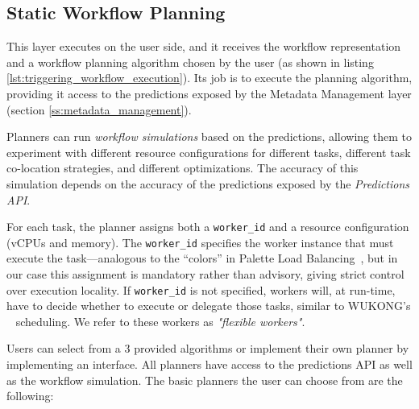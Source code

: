 \documentclass[conference]{IEEEtran}
\begin{document}
\subsection{Static Workflow Planning}
This layer executes on the user side, and it receives the workflow representation and a workflow planning algorithm chosen by the user (as shown in listing \ref{lst:triggering_workflow_execution}). Its job is to execute the planning algorithm, providing it access to the predictions exposed by the Metadata Management layer (section \ref{ss:metadata_management}).

Planners can run \textit{workflow simulations} based on the predictions, allowing them to experiment with different resource configurations for different tasks, different task co-location strategies, and different optimizations. The accuracy of this simulation depends on the accuracy of the predictions exposed by the \textit{Predictions API}.

For each task, the planner assigns both a \texttt{worker\_id} and a resource configuration (vCPUs and memory). The \texttt{worker\_id} specifies the worker instance that must execute the task—analogous to the “colors” in Palette Load Balancing~\cite{palette_load_balancing}, but in our case this assignment is mandatory rather than advisory, giving strict control over execution locality. If \texttt{worker\_id} is not specified, workers will, at run-time, have to decide whether to execute or delegate those tasks, similar to WUKONG's ~\cite{wukong_2} scheduling. We refer to these workers as \textit{"flexible workers"}.

Users can select from a 3 provided algorithms or implement their own planner by implementing an interface. All planners have access to the predictions API as well as the workflow simulation. The basic planners the user can choose from are the following:
\end{document}
